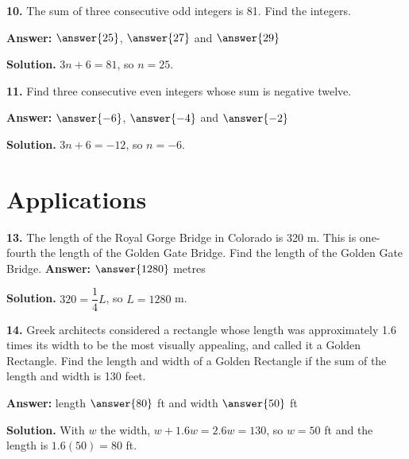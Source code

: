 \documentclass{ximera}
\begin{document}
\begin{problem}
\textbf{10.} The sum of three consecutive odd integers is 81. Find the integers.

\textbf{Answer:} $\answer{25}$, $\answer{27}$ and $\answer{29}$

\begin{hint}
\textbf{Solution.} $3n+6=81$, so $n=25$.
\end{hint}
\end{problem}

\begin{problem}
\textbf{11.} Find three consecutive even integers whose sum is negative twelve.

\textbf{Answer:} $\answer{-6}$, $\answer{-4}$ and $\answer{-2}$

\begin{hint}
\textbf{Solution.} $3n+6=-12$, so $n=-6$.
\end{hint}
\end{problem}

\section*{Applications}

\begin{problem}
\textbf{13.} The length of the Royal Gorge Bridge in Colorado is 320 m. This is
one-fourth the length of the Golden Gate Bridge. Find the length of the Golden Gate
Bridge. \qquad \textbf{Answer:} $\answer{1280}$ metres

\begin{hint}
\textbf{Solution.} $320=\dfrac{1}{4}L$, so $L=1280$ m.
\end{hint}
\end{problem}

\begin{problem}
\textbf{14.} Greek architects considered a rectangle whose length was approximately 1.6
times its width to be the most visually appealing, and called it a Golden Rectangle. Find
the length and width of a Golden Rectangle if the sum of the length and width is 130 feet.

\textbf{Answer:} length $\answer{80}$ ft and width $\answer{50}$ ft

\begin{hint}
\textbf{Solution.} With $w$ the width, $w+1.6w=2.6w=130$, so $w=50$ ft and the length is
$1.6(50)=80$ ft.
\end{hint}
\end{problem}
\end{document}
